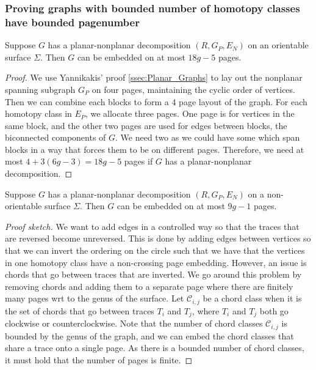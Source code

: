 \subsubsection{Proving graphs with bounded number of homotopy classes have bounded pagenumber}\label{sssec:bounded_pagenumber_homotopy}
\begin{lemma}\label{lem:planar_nonplanar_orientable}
	Suppose \(G\) has a planar-nonplanar decomposition \((R, G_P, E_N)\) on an orientable surface \(\Sigma\). Then \(G\) can be embedded on at most \(18g - 5\) pages.
\end{lemma}
\begin{proof}
	We use Yannikakis' proof \cref{ssec:Planar_Graphs} to lay out the nonplanar spanning subgraph \(G_P\) on four pages, maintaining the cyclic order of vertices. Then we can combine each blocks to form a 4 page layout of the graph. For each homotopy class in \(E_P\), we allocate three pages. One page is for vertices in the same block, and the other two pages are used for edges between blocks, the biconnected components of \(G\). We need two as we could have some which span blocks in a way that forces them to be on different pages. Therefore, we need at most \(4 + 3(6g - 3) = 18g-5\) pages if \(G\) has a planar-nonplanar decomposition. 
\end{proof}

\begin{lemma}\label{lem:planar_nonplanar_nonorientable}
	Suppose \(G\) has a planar-nonplanar decomposition \((R, G_P, E_N)\) on a non-orientable surface \(\Sigma\). Then \(G\) can be embedded on at most \(9g - 1\) pages.
\end{lemma}
\begin{proof}[Proof sketch]
	We want to add edges in a controlled way so that the traces that are reversed become unreversed. This is done by adding edges between vertices so that we can invert the ordering on the circle such that we have that the vertices in one homotopy class have a non-crossing page embedding. However, an issue is chords that go between traces that are inverted. We go around this problem by removing chords and adding them to a separate page where there are finitely many pages wrt to the genus of the surface. Let \(\mathcal{C}_{i,j}\) be a chord class when it is the set of chords that go between traces \(T_i\) and \(T_j\), where \(T_i\) and \(T_j\) both go clockwise or counterclockwise. Note that the number of chord classes \(\mathcal{C}_{i,j}\) is bounded by the genus of the graph, and we can embed the chord classes that share a trace onto a single page. As there is a bounded number of chord classes, it must hold that the number of pages is finite. 
\end{proof}
